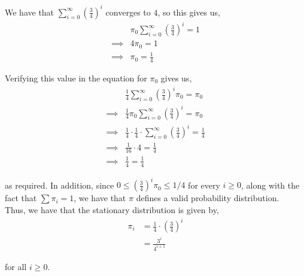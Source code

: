\documentclass[12pt]{article}
\begin{document}
We have that $\sum_{i=0}^{\infty} \left(\frac{3}{4}\right)^i$ converges to $4$, so this gives us,
\begin{align*}
&\pi_0 \sum_{i=0}^{\infty} \left(\frac{3}{4}\right)^i = 1\\
\implies &4\pi_0 = 1\\
\implies &\pi_0 = \frac{1}{4}
\end{align*}

Verifying this value in the equation for $\pi_0$ gives us,
\begin{align*}
&\frac{1}{4} \sum_{i=0}^{\infty} \left(\frac{3}{4}\right)^i\pi_0 = \pi_0\\
\implies &\frac{1}{4} \pi_0 \sum_{i=0}^{\infty} \left(\frac{3}{4}\right)^i = \pi_0\\
\implies &\frac{1}{4} \cdot \frac{1}{4} \cdot \sum_{i=0}^{\infty} \left(\frac{3}{4}\right)^i = \frac{1}{4}\\
\implies &\frac{1}{16} \cdot 4 = \frac{1}{4}\\
\implies &\frac{1}{4} = \frac{1}{4}
\end{align*}

as required. In addition, since $0 \leq \left(\frac{3}{4}\right)^i\pi_0 \leq 1/4$ for every $i \geq 0$, along with the fact that $\sum \pi_i = 1$, we have that $\pi$ defines a valid probability distribution.\\

Thus, we have that the stationary distribution is given by,
\begin{align*}
\pi_i &= \frac{1}{4} \cdot  \left(\frac{3}{4}\right)^i\\
&= \frac{3^i}{4^{i+1}}
\end{align*}

for all $i \geq 0$.
\end{document}
